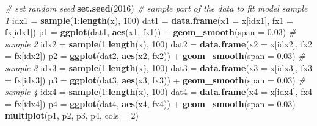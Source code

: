 \documentclass[12pt,]{krantz}
\newenvironment{Shaded}{\begin{snugshade}}{\end{snugshade}}
\newcommand{\KeywordTok}[1]{\textcolor[rgb]{0.13,0.29,0.53}{\textbf{{#1}}}}
\newcommand{\DataTypeTok}[1]{\textcolor[rgb]{0.13,0.29,0.53}{{#1}}}
\newcommand{\DecValTok}[1]{\textcolor[rgb]{0.00,0.00,0.81}{{#1}}}
\newcommand{\FloatTok}[1]{\textcolor[rgb]{0.00,0.00,0.81}{{#1}}}
\newcommand{\StringTok}[1]{\textcolor[rgb]{0.31,0.60,0.02}{{#1}}}
\newcommand{\CommentTok}[1]{\textcolor[rgb]{0.56,0.35,0.01}{\textit{{#1}}}}
\newcommand{\NormalTok}[1]{{#1}}
\theoremstyle{definition}
\theoremstyle{definition}
\theoremstyle{remark}
\begin{document}
\begin{Shaded}
\begin{Highlighting}[]
\CommentTok{# set random seed}
\KeywordTok{set.seed}\NormalTok{(}\DecValTok{2016}\NormalTok{)}
\CommentTok{# sample part of the data to fit model sample 1}
\NormalTok{idx1 =}\StringTok{ }\KeywordTok{sample}\NormalTok{(}\DecValTok{1}\NormalTok{:}\KeywordTok{length}\NormalTok{(x), }\DecValTok{100}\NormalTok{)}
\NormalTok{dat1 =}\StringTok{ }\KeywordTok{data.frame}\NormalTok{(}\DataTypeTok{x1 =} \NormalTok{x[idx1], }\DataTypeTok{fx1 =} \NormalTok{fx[idx1])}
\NormalTok{p1 =}\StringTok{ }\KeywordTok{ggplot}\NormalTok{(dat1, }\KeywordTok{aes}\NormalTok{(x1, fx1)) +}\StringTok{ }\KeywordTok{geom_smooth}\NormalTok{(}\DataTypeTok{span =} \FloatTok{0.03}\NormalTok{)}
\CommentTok{# sample 2}
\NormalTok{idx2 =}\StringTok{ }\KeywordTok{sample}\NormalTok{(}\DecValTok{1}\NormalTok{:}\KeywordTok{length}\NormalTok{(x), }\DecValTok{100}\NormalTok{)}
\NormalTok{dat2 =}\StringTok{ }\KeywordTok{data.frame}\NormalTok{(}\DataTypeTok{x2 =} \NormalTok{x[idx2], }\DataTypeTok{fx2 =} \NormalTok{fx[idx2])}
\NormalTok{p2 =}\StringTok{ }\KeywordTok{ggplot}\NormalTok{(dat2, }\KeywordTok{aes}\NormalTok{(x2, fx2)) +}\StringTok{ }\KeywordTok{geom_smooth}\NormalTok{(}\DataTypeTok{span =} \FloatTok{0.03}\NormalTok{)}
\CommentTok{# sample 3}
\NormalTok{idx3 =}\StringTok{ }\KeywordTok{sample}\NormalTok{(}\DecValTok{1}\NormalTok{:}\KeywordTok{length}\NormalTok{(x), }\DecValTok{100}\NormalTok{)}
\NormalTok{dat3 =}\StringTok{ }\KeywordTok{data.frame}\NormalTok{(}\DataTypeTok{x3 =} \NormalTok{x[idx3], }\DataTypeTok{fx3 =} \NormalTok{fx[idx3])}
\NormalTok{p3 =}\StringTok{ }\KeywordTok{ggplot}\NormalTok{(dat3, }\KeywordTok{aes}\NormalTok{(x3, fx3)) +}\StringTok{ }\KeywordTok{geom_smooth}\NormalTok{(}\DataTypeTok{span =} \FloatTok{0.03}\NormalTok{)}
\CommentTok{# sample 4}
\NormalTok{idx4 =}\StringTok{ }\KeywordTok{sample}\NormalTok{(}\DecValTok{1}\NormalTok{:}\KeywordTok{length}\NormalTok{(x), }\DecValTok{100}\NormalTok{)}
\NormalTok{dat4 =}\StringTok{ }\KeywordTok{data.frame}\NormalTok{(}\DataTypeTok{x4 =} \NormalTok{x[idx4], }\DataTypeTok{fx4 =} \NormalTok{fx[idx4])}
\NormalTok{p4 =}\StringTok{ }\KeywordTok{ggplot}\NormalTok{(dat4, }\KeywordTok{aes}\NormalTok{(x4, fx4)) +}\StringTok{ }\KeywordTok{geom_smooth}\NormalTok{(}\DataTypeTok{span =} \FloatTok{0.03}\NormalTok{)}
\KeywordTok{multiplot}\NormalTok{(p1, p2, p3, p4, }\DataTypeTok{cols =} \DecValTok{2}\NormalTok{)}
\end{Highlighting}
\end{Shaded}
\end{document}
